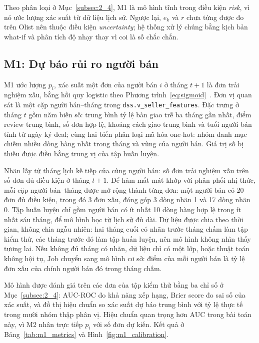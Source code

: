 \documentclass[a4paper]{article}
\begin{document}
Theo phân loại ở Mục~\ref{subsec:2_4}, M1 là mô hình tĩnh trong điều kiện \textit{risk}, vì nó ước lượng xác suất từ dữ liệu lịch sử. Ngược lại, $e_k$ và $r$ chưa từng được đo trên Olist nên thuộc điều kiện \textit{uncertainty}; hệ thống xử lý chúng bằng kịch bản what-if và phân tích độ nhạy thay vì coi là số chắc chắn.

\subsection{M1: Dự báo rủi ro người bán}
\label{subsec:5_5}

M1 ước lượng $p_i$, xác suất một đơn của người bán $i$ ở tháng $t+1$ là đơn trải nghiệm xấu, bằng hồi quy logistic theo Phương trình~\eqref{eq:sigmoid}~\cite{bib:sklearn}. Đơn vị quan sát là một cặp người bán--tháng trong \texttt{dss.\allowbreak{}v\_\allowbreak{}seller\_\allowbreak{}features}. Đặc trưng ở tháng $t$ gồm năm biến số: trung bình tỷ lệ bàn giao trễ ba tháng gần nhất, điểm review trung bình, số đơn hợp lệ, khoảng cách giao trung bình và tuổi người bán tính từ ngày ký deal; cùng hai biến phân loại mã hóa one-hot: nhóm danh mục chiếm nhiều dòng hàng nhất trong tháng và vùng của người bán. Giá trị số bị thiếu được điền bằng trung vị của tập huấn luyện.

Nhãn lấy từ tháng lịch kế tiếp của cùng người bán: số đơn trải nghiệm xấu trên số đơn đủ điều kiện ở tháng $t+1$. Để hàm mất mát khớp với phân phối nhị thức, mỗi cặp người bán--tháng được mở rộng thành từng đơn: một người bán có 20 đơn đủ điều kiện, trong đó 3 đơn xấu, đóng góp 3 dòng nhãn 1 và 17 dòng nhãn 0. Tập huấn luyện chỉ gồm người bán có ít nhất 10 dòng hàng hợp lệ trong ít nhất sáu tháng, để mô hình học từ lịch sử đủ dài. Dữ liệu được chia theo thời gian, không chia ngẫu nhiên: hai tháng cuối có nhãn trước tháng chấm làm tập kiểm thử, các tháng trước đó làm tập huấn luyện, nên mô hình không nhìn thấy tương lai. Nếu không đủ tháng có nhãn, dữ liệu chỉ có một lớp, hoặc thuật toán không hội tụ, Job chuyển sang mô hình cơ sở: điểm của mỗi người bán là tỷ lệ đơn xấu của chính người bán đó trong tháng chấm.

Mô hình được đánh giá trên các đơn của tập kiểm thử bằng ba chỉ số ở Mục~\ref{subsec:2_4}: AUC-ROC đo khả năng xếp hạng, Brier score đo sai số của xác suất, và đồ thị hiệu chuẩn so xác suất dự báo trung bình với tỷ lệ thực tế trong mười nhóm thập phân vị. Hiệu chuẩn quan trọng hơn AUC trong bài toán này, vì M2 nhân trực tiếp $p_i$ với số đơn dự kiến. Kết quả ở Bảng~\ref{tab:m1_metrics} và Hình~\ref{fig:m1_calibration}.
\end{document}
